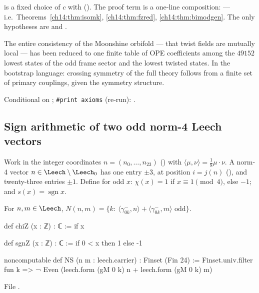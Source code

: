 \begin{dictionary}
 is a fixed choice of $c$ with  ().  The proof
term is a one-line composition:  — i.e.\ Theorems~\ref{ch14:thm:isomk}, \ref{ch14:thm:fzred},
\ref{ch14:thm:bimodgen}.  The only hypotheses are  and .
\end{dictionary}

\begin{physics}
The entire consistency of the Moonshine orbifold — that twist fields are mutually local — has been
reduced to one finite table of OPE coefficients among the $49152$ lowest states of the odd frame sector
and the lowest twisted states.  In the bootstrap language: crossing symmetry of the full theory follows
from a finite set of primary couplings, given the symmetry structure.
\end{physics}

\begin{status}
Conditional on ; \texttt{\#print axioms} (re-run): .
\end{status}

\subsection{Sign arithmetic of two odd norm-4 Leech vectors}

Work in the integer coordinates $n=(n_0,\dots,n_{23})$ () with $\langle\mu,\nu\rangle=\tfrac18\mu\cdot\nu$.
A norm-4 vector $n\in\Leech\setminus\Leech_0$ has one entry $\pm3$, at position $i=j(n)$ (), and
twenty-three entries $\pm1$.  Define for odd $x$: $\chi(x)=1$ if $x\equiv1\pmod4$, else $-1$; and
$s(x)=\operatorname{sgn}x$.

\begin{definition}\label{ch14:def:NS}
For $n,m\in\Leech$, $N(n,m)=\{k:\ \langle\gamma^-_{0k},n\rangle+\langle\gamma^-_{0k},m\rangle\text{ odd}\}$.
\end{definition}
\begin{leancode}
def chiZ (x : ℤ) : ℂ := if x %

def sgnZ (x : ℤ) : ℂ := if 0 < x then 1 else -1

noncomputable def NS (n m : leech.carrier) : Finset (Fin 24) :=
  Finset.univ.filter fun k => ¬ Even (leech.form (gM 0 k) n + leech.form (gM 0 k) m)
\end{leancode}
File .

